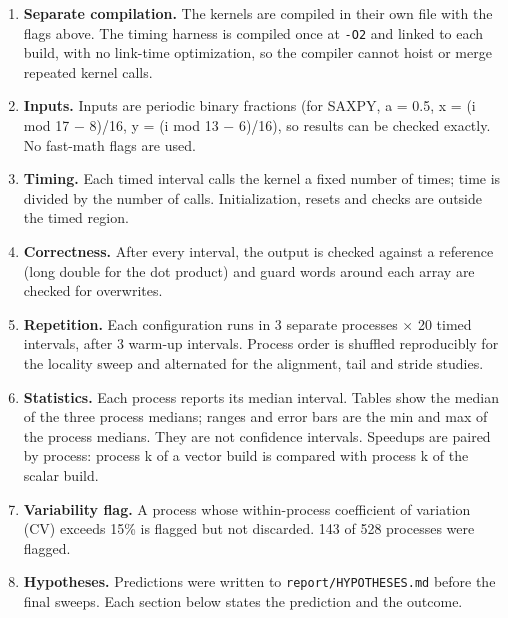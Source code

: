 \documentclass[10pt,letterpaper]{article}
\begin{document}
\begin{enumerate}\setlength{\itemsep}{2pt}

\item \textbf{Separate compilation.} The kernels are compiled in their own file with the flags above. The timing harness is compiled once at \texttt{-O2} and linked to each build, with no link-time optimization, so the compiler cannot hoist or merge repeated kernel calls.

\item \textbf{Inputs.} Inputs are periodic binary fractions (for SAXPY, a = 0.5, x = (i mod 17 $-$ 8)/16, y = (i mod 13 $-$ 6)/16), so results can be checked exactly. No fast-math flags are used.

\item \textbf{Timing.} Each timed interval calls the kernel a fixed number of times; time is divided by the number of calls. Initialization, resets and checks are outside the timed region.

\item \textbf{Correctness.} After every interval, the output is checked against a reference (long double for the dot product) and guard words around each array are checked for overwrites.

\item \textbf{Repetition.} Each configuration runs in 3 separate processes $\times$ 20 timed intervals, after 3 warm-up intervals. Process order is shuffled reproducibly for the locality sweep and alternated for the alignment, tail and stride studies.

\item \textbf{Statistics.} Each process reports its median interval. Tables show the median of the three process medians; ranges and error bars are the min and max of the process medians. They are not confidence intervals. Speedups are paired by process: process k of a vector build is compared with process k of the scalar build.

\item \textbf{Variability flag.} A process whose within-process coefficient of variation (CV) exceeds 15\% is flagged but not discarded. 143 of 528 processes were flagged.

\item \textbf{Hypotheses.} Predictions were written to \texttt{report/HYPOTHESES.md} before the final sweeps. Each section below states the prediction and the outcome.

\end{enumerate}
\end{document}
